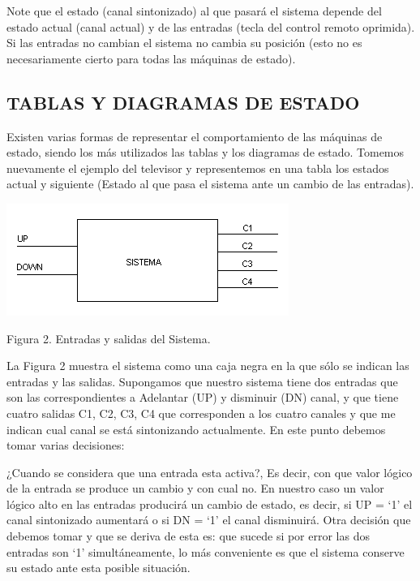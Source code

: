 Note que el estado (canal sintonizado) al que pasará el sistema depende del estado actual (canal actual) y de las entradas (tecla del control
remoto oprimida). Si las entradas no cambian el sistema no cambia su posición (esto no es necesariamente cierto para todas las máquinas de
estado).

\subsection[TABLAS Y DIAGRAMAS DE ESTADO]{TABLAS Y DIAGRAMAS DE ESTADO}

Existen varias formas de representar el comportamiento de las máquinas
de estado, siendo los más utilizados las tablas y los diagramas de
estado. Tomemos nuevamente el ejemplo del televisor y representemos en
una tabla los estados actual y siguiente (Estado al que pasa el sistema
ante un cambio de las entradas).

{\centering 
\includegraphics[width=9.206cm,height=3.651cm]{./images/FSM-img2.png} \par}

{\centering
Figura 2. Entradas y salidas del Sistema.
\par}

La Figura 2 muestra el sistema como una caja negra en la que sólo se indican las entradas y las salidas. Supongamos que nuestro sistema tiene dos entradas que son las correspondientes a Adelantar (UP) y disminuir (DN) canal, y que tiene cuatro salidas C1, C2, C3, C4 que corresponden a los cuatro canales y que me indican cual canal se está sintonizando actualmente. En este punto debemos tomar varias decisiones:

¿Cuando se considera que una entrada esta activa?, Es decir, con que valor lógico de la entrada se produce un cambio y con cual no. En nuestro caso un valor lógico alto en las entradas producirá un cambio de estado, es decir, si UP = {\textquoteleft}1{\textquoteright} el canal sintonizado aumentará o si DN = {\textquoteleft}1{\textquoteright} el canal disminuirá. Otra decisión que debemos tomar y que se deriva de esta es: que sucede si por error las dos entradas son {\textquoteleft}1{\textquoteright} simultáneamente, lo más conveniente es que el sistema conserve su estado ante esta posible situación.

